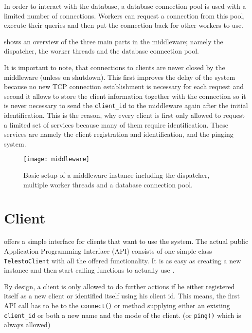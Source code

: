 \documentclass[a4paper, oneside]{csthesis}
\begin{document}
    In order to interact with the database, a database connection pool is used
    with a limited number of connections. Workers can request a connection from
    this pool, execute their queries and then put the connection back for other
    workers to use.
    
     shows an overview of the three main parts in the
    middleware; namely the dispatcher, the worker threads and the database
    connection pool.
    
    It is important to note, that connections to clients are never closed by the
    middleware (unless on shutdown). This first improves the delay of the
    system because no new TCP connection establishment is necessary for each
    request and second it allows to store the client information together with
    the connection so it is never necessary to send the {\tt client\_id} to the
    middleware again after the initial identification. This is the reason, why
    every client is first only allowed to request a limited set of services
    because many of them require identification. These services are namely the
    client registration and identification, and the pinging system.

    \begin{figure}[ht]
        \centering
            \texttt{[image: middleware]}
            \caption{Basic setup of a middleware instance including the
            dispatcher, multiple worker threads and a database connection pool.}
            \label{fig:middleware}
    \end{figure}


\section{Client}
    \telesto{} offers a simple interface for clients that want to use the system.
    The actual public Application Programming Interface (API) consists of one
    simple class {\tt TelestoClient} with all the offered functionality. It is
    as easy as creating a new instance and then start calling functions to
    actually use \telesto.
    
    By design, a client is only allowed to do further actions if he either
    registered itself as a new client or identified itself using his client id.
    This means, the first API call has to be to the {\tt connect()} or method
    supplying either an existing {\tt client\_id} or both a new name and the
    mode of the client. (or {\tt ping()} which is always allowed)
    
\end{document}
